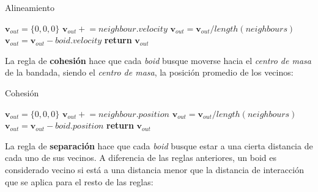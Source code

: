 \documentclass[a4paper]{article}
\begin{document}
            \begin{algorithm}
                \caption{Alineamiento}\label{pseudo:alignment}
                \begin{algorithmic}[1]
                    \State $\bm{v}_{out} = \{0, 0, 0\}$
                        \State $\bm{v}_{out} \mathrel{+}= neighbour.velocity$
                    \EndFor
                    \State $\bm{v}_{out} = \bm{v}_{out} / length(neighbours)$
                    \State $\bm{v}_{out} = \bm{v}_{out} - boid.velocity$
                    \State \textbf{return} $\bm{v}_{out}$
                    \EndProcedure
                \end{algorithmic}
            \end{algorithm}

            La regla de \textbf{cohesión} hace que cada \textit{boid} busque moverse hacia el \textit{centro de masa} de la bandada, siendo el \textit{centro de masa}, la posición promedio de los vecinos:

            \begin{algorithm}
                \caption{Cohesión}\label{pseudo:cohesion}
                \begin{algorithmic}[1]
                    \State $\bm{v}_{out} = \{0, 0, 0\}$
                        \State $\bm{v}_{out} \mathrel{+}= neighbour.position$
                    \EndFor
                    \State $\bm{v}_{out} = \bm{v}_{out} / length(neighbours)$
                    \State $\bm{v}_{out} = \bm{v}_{out} - boid.position$
                    \State \textbf{return} $\bm{v}_{out}$
                    \EndProcedure
                \end{algorithmic}
            \end{algorithm}

            La regla de \textbf{separación} hace que cada \textit{boid} busque estar a una cierta distancia de cada uno de sus vecinos. A diferencia de las reglas anteriores, un boid es considerado vecino si está a una distancia menor que la distancia de interacción que se aplica para el resto de las reglas:
\end{document}
